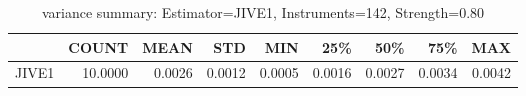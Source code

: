 \begin{table}[ht]
\centering
\caption{variance summary: Estimator=JIVE1, Instruments=142, Strength=0.80}
\begin{tabular}{lrrrrrrrr}
\toprule
 & COUNT & MEAN & STD & MIN & 25\% & 50\% & 75\% & MAX \\
\midrule
JIVE1 & 10.0000 & 0.0026 & 0.0012 & 0.0005 & 0.0016 & 0.0027 & 0.0034 & 0.0042 \\
\bottomrule
\end{tabular}
\end{table}
